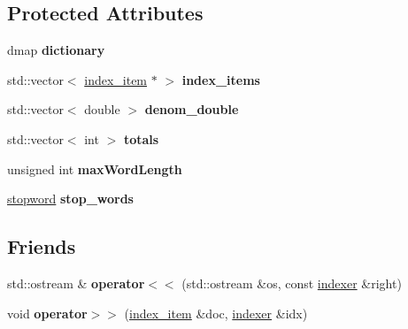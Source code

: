 \subsection*{Protected Attributes}
\begin{DoxyCompactItemize}
\item 
\mbox{\label{classindexer_aa48b1798b0488abfedb9d664d2196893}} 
dmap {\bfseries dictionary}
\item 
\mbox{\label{classindexer_a780732f95bd0822d5b0e7fb81b1569c0}} 
std\+::vector$<$ \hyperlink{classindex__item}{index\+\_\+item} $\ast$ $>$ {\bfseries index\+\_\+items}
\item 
\mbox{\label{classindexer_ad9beb15bff1c7567dc9869711f82088e}} 
std\+::vector$<$ double $>$ {\bfseries denom\+\_\+double}
\item 
\mbox{\label{classindexer_a60d8c3428894603e53b59d5e4146f411}} 
std\+::vector$<$ int $>$ {\bfseries totals}
\item 
\mbox{\label{classindexer_acecde45d9eddf81e7c241fe8252de998}} 
unsigned int {\bfseries max\+Word\+Length}
\item 
\mbox{\label{classindexer_a109471f4ff61ac6960845c28bf44cc61}} 
\hyperlink{classstopword}{stopword} {\bfseries stop\+\_\+words}
\end{DoxyCompactItemize}
\subsection*{Friends}
\begin{DoxyCompactItemize}
\item 
\mbox{\label{classindexer_a96fe63b3dbcc00194498ff6fc23da381}} 
std\+::ostream \& {\bfseries operator$<$$<$} (std\+::ostream \&os, const \hyperlink{classindexer}{indexer} \&right)
\item 
\mbox{\label{classindexer_a81f04506b77d7cac6b29c6fd84a8665f}} 
void {\bfseries operator$>$$>$} (\hyperlink{classindex__item}{index\+\_\+item} \&doc, \hyperlink{classindexer}{indexer} \&idx)
\end{DoxyCompactItemize}


